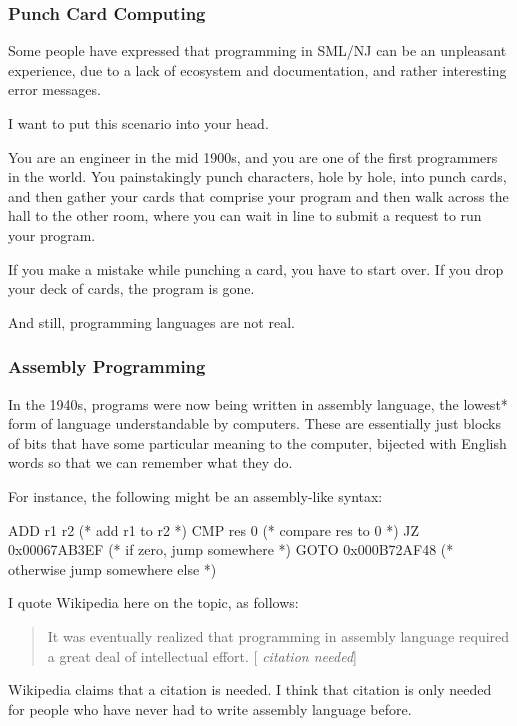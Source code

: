 \documentclass[aspectratio=169]{beamer}
\begin{document}
\begin{frame}[fragile]
  \frametitle{Punch Card Computing}

  Some people have expressed that programming in SML/NJ can be an unpleasant
  experience, due to a lack of ecosystem and documentation, and rather
  interesting error messages.

  \pause
  \vspace{\fill}

  I want to put this scenario into your head.

  \pause
  \vspace{\fill}

  You are an engineer in the mid 1900s, and you are one of the first programmers
  in the world. You painstakingly punch characters, hole by hole, into punch cards,
  and then gather your cards that comprise your program and then walk across the
  hall to the other room, where you can wait in line to submit a request to
  run your program.

  \pause
  \vspace{\fill}

  If you make a mistake while punching a card, you have to start over. If you
  drop your deck of cards, the program is gone.

  \pause
  \vspace{\fill}

  And still, programming languages are not real.
\end{frame}

\begin{frame}[fragile]
  \frametitle{Assembly Programming}

  In the 1940s, programs were now being written in assembly language, the lowest*
  form of language understandable by computers. These are essentially just blocks
  of bits that have some particular meaning to the computer, bijected with
  English words so that we can remember what they do.

  \pause
  \vspace{\fill}

  For instance, the following might be an assembly-like syntax:
  \begin{codeblock}
    ADD r1 r2         (* add r1 to r2 *)
    CMP res 0         (* compare res to 0 *)
    JZ   0x00067AB3EF (* if zero, jump somewhere *)
    GOTO 0x000B72AF48 (* otherwise jump somewhere else *)
  \end{codeblock}

  \pause
  \vspace{\fill}

  I quote Wikipedia here on the topic, as follows:
  \pause
  \begin{quote}
    It was eventually realized that programming in assembly language required a
    great deal of intellectual effort. [{\color{blue} \textit{citation needed}}]
  \end{quote}

  \pause
  \vspace{\fill}

  Wikipedia claims that a citation is needed. I think that citation is only needed
  for people who have never had to write assembly language before.
\end{frame}
\end{document}
